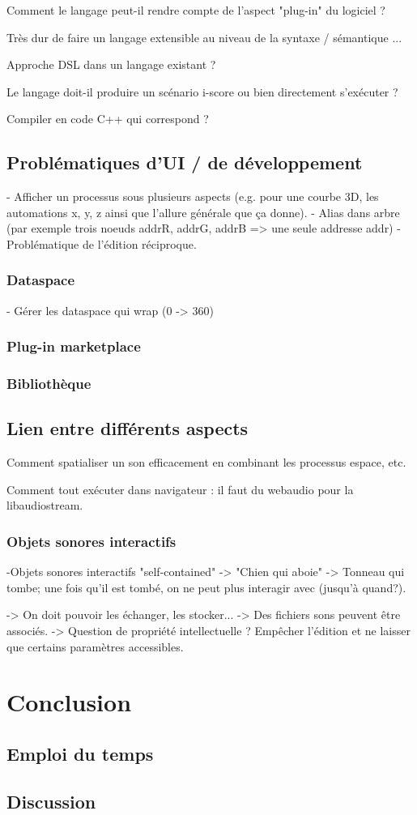 \documentclass[french,a4paper,openany,12pt]{book}
\begin{document}
Comment le langage peut-il rendre compte de l'aspect "plug-in" du logiciel ? 

Très dur de faire un langage extensible au niveau de la syntaxe / sémantique ...

Approche DSL dans un langage existant ?

Le langage doit-il produire un scénario i-score ou bien directement s'exécuter ? 

Compiler en code C++ qui correspond ? 

\section{Problématiques d'UI / de développement}
- Afficher un processus sous plusieurs aspects (e.g. pour une courbe 3D, les automations x, y, z ainsi que l'allure générale que ça donne).
- Alias dans arbre (par exemple trois noeuds addrR, addrG, addrB => une seule addresse addr)
- Problématique de l'édition réciproque.
\subsection{Dataspace}
- Gérer les dataspace qui wrap (0 -> 360)
\subsection{Plug-in marketplace}
\subsection{Bibliothèque}

\section{Lien entre différents aspects}
Comment spatialiser un son efficacement en combinant les processus espace, etc.

Comment tout exécuter dans navigateur : il faut du webaudio pour la libaudiostream.

\subsection{Objets sonores interactifs}
-Objets sonores interactifs "self-contained"
-> "Chien qui aboie" 
-> Tonneau qui tombe; une fois qu'il est tombé, on ne peut plus interagir avec (jusqu'à quand?).

-> On doit pouvoir les échanger, les stocker...
-> Des fichiers sons peuvent être associés.
-> Question de propriété intellectuelle ? 
Empêcher l'édition et ne laisser que certains paramètres accessibles.
\chapter{Conclusion}
\section{Emploi du temps}
\section{Discussion}
\end{document}

